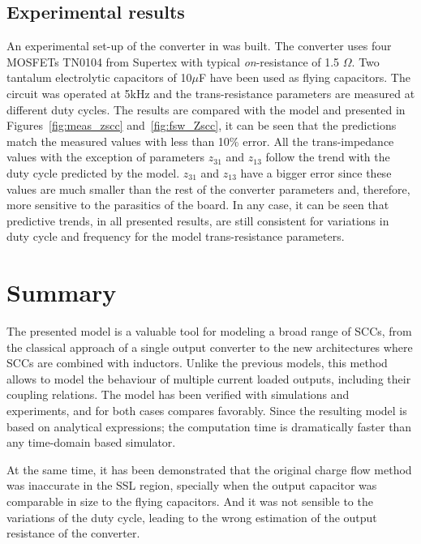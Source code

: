 \subsection{Experimental results}
An experimental set-up of the converter in was built. The converter uses four MOSFETs TN0104 from Supertex with typical \emph{on}-resistance of 1.5 $\Omega$. Two tantalum electrolytic capacitors of 10$\mu$F have been used as flying capacitors. The circuit was operated at 5kHz and the trans-resistance parameters are measured at different duty cycles. The results are compared with the model and  presented in Figures~\ref{fig:meas_zscc} and~\ref{fig:fsw_Zscc}, it can be seen that the predictions match the measured values with less than 10\% error. All the trans-impedance values with the exception of  parameters $z_{31}$ and $z_{13}$ follow the trend with the duty cycle predicted by the model. $z_{31}$ and $z_{13}$ have a bigger error since these values are much smaller than the rest of the converter parameters and, therefore, more sensitive to the parasitics of the board. In any case, it can be seen that predictive trends, in all presented results, are still consistent for variations in duty cycle and frequency for the model trans-resistance parameters.





\section{Summary}
The presented model is a valuable tool for  modeling a broad range of SCCs, from the classical approach of a single output converter to the new architectures where SCCs are combined with inductors. Unlike the previous models, this method allows to model the behaviour of multiple current loaded outputs, including their coupling relations. The model has been verified with simulations and experiments, and for both cases compares favorably. Since the resulting model is based on analytical expressions; the computation time is dramatically faster than any time-domain based simulator.

At the same time, it has been demonstrated that the original charge flow method was inaccurate in the SSL region, specially when the output capacitor was comparable in size to the flying capacitors. And it was not sensible to the variations of the duty cycle, leading to the wrong estimation of the output resistance of the converter.

